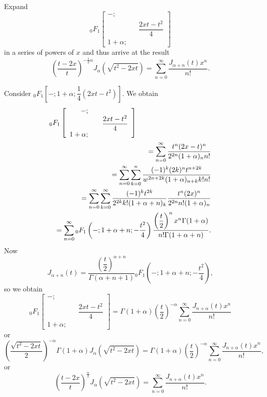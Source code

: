 \begin{problem} \label{problem12chapter6}
Expand
$${}_0F_1 \left[ \begin{array}{rlr}
-; & & \\
& & \dfrac{2xt - t^2}{4} \\
1+\alpha; & & 
\end{array} \right]$$
in a series of powers of $x$ and thus arrive at the result
$$\left( \dfrac{t-2x}{t} \right)^{-\frac{1}{2} \alpha} J_{\alpha}(\sqrt{t^2-2xt}) = \displaystyle\sum_{n=0}^{\infty} \dfrac{J_{\alpha+n}(t)x^n}{n!}.$$
\end{problem}
\begin{solution}
Consider ${}_0F_1 \left[-;1+\alpha; \dfrac{1}{4}(2xt-t^2) \right]$. We obtain
\begin{eqnarray*}
\lefteqn{{}_0F_1 \left[ \begin{array}{rlr}
- ; & & \\
& & \dfrac{2xt-t^2}{4} \\
1+\alpha; & &
\end{array} \right]} \\
& &= \displaystyle\sum_{n=0}^{\infty} \dfrac{t^n (2x-t)^n}{2^{2n} (1+\alpha)_n n!} \\
& &= \displaystyle\sum_{n=0}^{\infty} \displaystyle\sum_{k=0}^n \dfrac{(-1)^k (2k)^n t^{n+2k}}{w^{2n+2k}(1+\alpha)_{n+k} k! n!} \\
& &= \displaystyle\sum_{n=0}^{\infty} \displaystyle\sum_{k=0}^{\infty} \dfrac{(-1)^k t^{2k}}{2^{2k} k! (1+\alpha+n)_k} \dfrac{t^n (2x)^n}{2^{2n} n! (1+\alpha)_n} \\
& &= \displaystyle\sum_{n=0}^{\infty} {}_0F_1 \left(-;1+\alpha+n; - \dfrac{t^2}{4} \right) \dfrac{ \left( \dfrac{t}{2} \right)^n x^n \Gamma(1 + \alpha)}{n! \Gamma(1 + \alpha + n)}.
\end{eqnarray*}
Now
$$J_{\alpha+n}(t) = \dfrac{\left( \dfrac{t}{2} \right)^{\alpha + n}}{\Gamma(\alpha + n +1)} {}_0F_1 \left(-; 1 + \alpha + n; -\dfrac{t^2}{4} \right),$$
so we obtain
$${}_0F_1 \left[ \begin{array}{rlr}
-; & & \\
& & \dfrac{2xt-t^2}{4} \\
1 + \alpha ; & & 
\end{array} \right] = \Gamma(1 + \alpha) \left( \dfrac{t}{2} \right)^{-\alpha} \displaystyle\sum_{n=0}^{\infty} \dfrac{J_{n+\alpha}(t)x^n}{n!}$$
or
$$\left( \dfrac{\sqrt{t^2-2xt}}{2} \right)^{-\alpha} \Gamma(1 + \alpha) J_{\alpha} \left( \sqrt{t^2 - 2xt} \right) = \Gamma(1 + \alpha) \left( \dfrac{t}{2} \right)^{-\alpha} \displaystyle\sum_{n=0}^{\infty} \dfrac{J_{n + \alpha}(t)x^n}{n!},$$
or
$$\left( \dfrac{t-2x}{t} \right)^{\frac{\alpha}{2}} J_{\alpha} ( \sqrt{t^2-2xt} ) = \displaystyle\sum_{n=0}^{\infty} \dfrac{J_{n + \alpha}(t)x^n}{n!}.$$
\end{solution}
